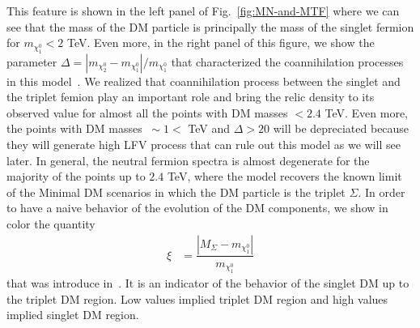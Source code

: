 \documentclass[12pt,letterpaper]{article}
\begin{document}
This feature is shown in the left panel of Fig.~\ref{fig:MN-and-MTF} where we can see that the mass of the DM particle is principally the mass of the singlet fermion for $m_{\chi_1^0}<2$ TeV. 
Even more, in the right panel of this figure, we show the parameter $\Delta=|m_{\chi_2^0}-m_{\chi_1^0}|/m_{\chi_1^0}$ that characterized the coannihilation processes in this model~\cite{Griest:1990kh}. 
We realized that coannihilation process between the singlet and the triplet femion play an important role and bring the relic density to its observed value for almost all the points with DM masses $<2.4$ TeV. Even more, the points with DM masses $~\sim 1<$ TeV and $\Delta > 20$ will be depreciated because they will generate high LFV process that can rule out this model as we will see later. 
In general, the neutral fermion spectra is almost degenerate for the majority of the points up to $2.4$ TeV, where the model recovers the known limit of the Minimal DM scenarios in which the DM particle is the triplet $\Sigma$. 
In order to have a naive behavior of the evolution of the DM components, we show in color the quantity
%
\begin{align}
\label{eq:xi}
\xi &=\dfrac{|M_\Sigma - m_{\chi^0_1}|}{m_{\chi^0_1}}
\end{align}
%
that was introduce in~\cite{Hirsch:2013ola}. It is an indicator of the behavior of the singlet DM up to the triplet DM region. Low values implied triplet DM region and high values implied singlet DM region.
%
\end{document}
